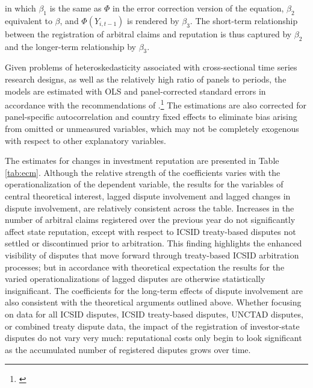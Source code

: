 \documentclass[12pt,onesided]{amsart}
\begin{document}
in which $\beta_{1}$ is the same as $\Phi$ in the error correction version of the equation, $\beta_{2}$ equivalent to $\beta$, and $\Phi(Y_{i,t-1})$ is rendered by $\beta_{3}$. The short-term relationship between the registration of arbitral claims and reputation is thus captured by $\beta_{2}$  and the longer-term relationship by $\beta_{3}$.

Given problems of heteroskedasticity associated with cross-sectional time series research designs, as well as the relatively high ratio of panels to periods, the models are estimated with OLS and panel-corrected standard errors in accordance with the recommendations of \citeauthor{beck:katz:1995}.\footnote{\citet{beck:katz:1995}} The estimations are also corrected for panel-specific autocorrelation and country fixed effects to eliminate bias arising from omitted or unmeasured variables, which may not be completely exogenous with respect to other explanatory variables.

The estimates for changes in investment reputation are presented in Table \ref{tab:ecm}. Although the relative strength of the coefficients varies with the operationalization of the dependent variable, the results for the variables of central theoretical interest, lagged dispute involvement and lagged changes in dispute involvement, are relatively consistent across the table. Increases in the number of arbitral claims registered over the previous year do not significantly affect state reputation, except with respect to ICSID treaty-based disputes not settled or discontinued prior to arbitration. This finding highlights the enhanced visibility of disputes that move forward through treaty-based ICSID arbitration processes; but in accordance with theoretical expectation the results for the varied operationalizations of lagged disputes are otherwise statistically insignificant. The coefficients for the long-term effects of dispute involvement are also consistent with the theoretical arguments outlined above. Whether focusing on data for all ICSID disputes, ICSID treaty-based disputes, UNCTAD disputes, or combined treaty dispute data, the impact of the registration of investor-state disputes do not vary very much: reputational costs only begin to look significant as the accumulated number of registered disputes grows over time.

\end{document}
